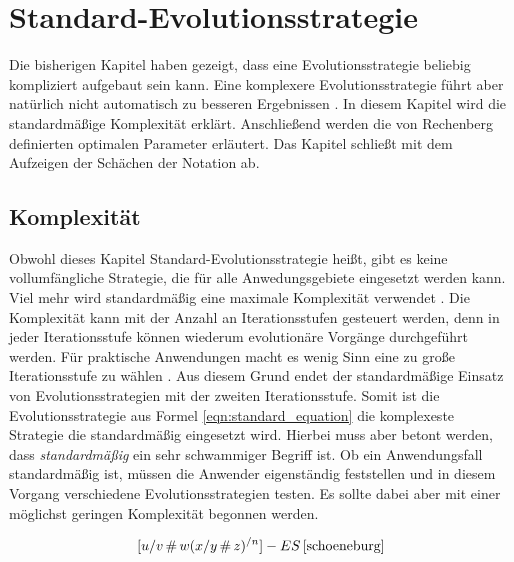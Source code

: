 
\section{Standard-Evolutionsstrategie}
Die bisherigen Kapitel haben gezeigt, dass eine Evolutionsstrategie beliebig kompliziert aufgebaut sein kann. Eine komplexere Evolutionsstrategie führt aber natürlich nicht automatisch zu besseren Ergebnissen \cite[S.165]{schoeneburg}.
In diesem Kapitel wird die standardmäßige Komplexität erklärt. Anschließend werden die von Rechenberg definierten optimalen Parameter erläutert. Das Kapitel schließt mit dem Aufzeigen der Schächen der Notation ab.

\subsection{Komplexität}
Obwohl dieses Kapitel Standard-Evolutionsstrategie heißt, gibt es keine vollumfängliche Strategie, die für alle Anwedungsgebiete eingesetzt werden kann. Viel mehr wird standardmäßig eine maximale Komplexität verwendet \cite[S.165]{schoeneburg}.
Die Komplexität kann mit der Anzahl an Iterationsstufen gesteuert werden, denn in jeder Iterationsstufe können wiederum evolutionäre Vorgänge durchgeführt werden.
Für praktische Anwendungen macht es wenig Sinn eine zu große Iterationsstufe zu wählen \cite[S.165]{schoeneburg}. Aus diesem Grund endet der standardmäßige Einsatz von Evolutionsstrategien mit der zweiten Iterationsstufe.
Somit ist die Evolutionsstrategie aus Formel \ref{eqn:standard_equation} die komplexeste Strategie die standardmäßig eingesetzt wird. Hierbei muss aber betont werden, dass \textit{standardmäßig} ein sehr schwammiger Begriff ist. 
Ob ein Anwendungsfall standardmäßig ist, müssen die Anwender eigenständig feststellen und in diesem Vorgang verschiedene Evolutionsstrategien testen. Es sollte dabei aber mit einer möglichst geringen Komplexität begonnen werden.

\begin{equation}
\label{eqn:standard_equation}
[u/v\,\#\,w (x/y\,\#\,z)^{/n}]-ES\, \cite[S.165]{schoeneburg}
\end{equation}

